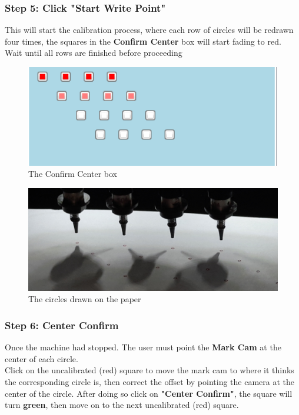 \documentclass[a4paper,10pt]{report}
\begin{document}
\subsubsection{Step 5: Click "Start Write Point" }
This will start the calibration process, where each row of circles will be redrawn four times, the squares in the \textbf{Confirm Center} box will start fading to red. Wait until all rows are finished before proceeding
 \begin{figure}[!htb]
 \centering
 \includegraphics[width=1\textwidth]{scrot36.png}
 \caption{The Confirm Center box}
\end{figure}
 \begin{figure}[!htb]
 \centering
 \includegraphics[width=1\textwidth]{circles.png}
 \caption{The circles drawn on the paper}
\end{figure}
\newpage
\subsubsection{Step 6: Center Confirm}
Once the machine had stopped. The user must point the \textbf{Mark Cam} at the center of each circle.\\
Click on the uncalibrated (red) square to move the mark cam to where it thinks the corresponding circle is, then correct the offset by pointing the camera at the center of the circle. After doing so click on \textbf{"Center Confirm"}, the square will turn \textbf{green}, then move on to the next uncalibrated (red) square.\\
\end{document}

